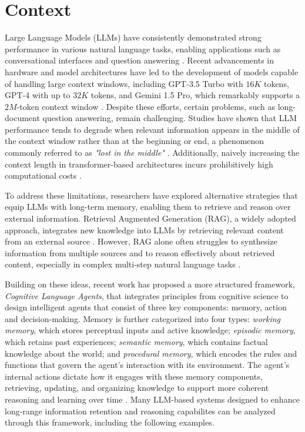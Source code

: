 \section{Context}
\label{sec:context}

Large Language Models (LLMs) have consistently demonstrated strong performance in various natural language tasks, enabling applications such as conversational interfaces and question answering \cite{minaee2024largelanguagemodelssurvey}. Recent advancements in hardware and model architectures have led to the development of models capable of handling large context windows, including GPT-3.5 Turbo with $16K$ tokens, GPT-4 with up to $32K$ tokens, and Gemini 1.5 Pro, which remarkably supports a $2M$-token context window
\cite{liu2023lostmiddlelanguagemodels}\cite{openai2024gpt4technicalreport}\cite{geminiteam2024gemini15unlockingmultimodal}. Despite these efforts, certain problems, such as long-document question answering, remain challenging. Studies have shown that LLM performance tends to degrade when relevant information appears in the middle of the context window rather than at the beginning or end, a phenomenon commonly referred to as \textit{"lost in the middle"} \cite{liu2023lostmiddlelanguagemodels}. Additionally, naively increasing the context length in transformer-based architectures incurs prohibitively high computational costs \cite{kitaev2020reformerefficienttransformer}.

\noindent To address these limitations, researchers have explored alternative strategies that equip LLMs with long-term memory, enabling them to retrieve and reason over external information. Retrieval Augmented Generation (RAG), a widely adopted approach, integrates new knowledge into LLMs by retrieving relevant content from an external source \cite{lewis2021retrievalaugmentedgenerationknowledgeintensivenlp}. However, RAG alone often struggles to synthesize information from multiple sources and to reason effectively about retrieved content, especially in complex multi-step natural language tasks \cite{NEURIPS2024_6ddc001d}\cite{liang2024kagboostingllmsprofessional}.

\noindent Building on these ideas, recent work has proposed a more structured framework, \textit{Cognitive Language Agents}, that integrates principles from cognitive science to design intelligent agents that consist of three key components: memory, action and decision-making. Memory is further categorized into four types: \textit{working memory}, which stores perceptual inputs and active knowledge; \textit{episodic memory}, which retains past experiences; \textit{semantic memory}, which contains factual knowledge about the world; and \textit{procedural memory}, which encodes the rules and functions that govern the agent's interaction with its environment. The agent's internal actions dictate how it engages with these memory components, retrieving, updating, and organizing knowledge to support more coherent reasoning and learning over time \cite{sumers2024cognitive}. Many LLM-based systems designed to enhance long-range information retention and reasoning capabilites can be analyzed through this framework, including the following examples.

